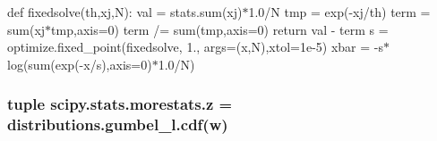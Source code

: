 def fixedsolve(th,xj,\+N)\+: val = stats.\+sum(xj)$\ast$1.0/\+N tmp = exp(-\/xj/th) term = sum(xj$\ast$tmp,axis=0) term /= sum(tmp,axis=0) return val -\/ term s = optimize.\+fixed\+\_\+point(fixedsolve, 1., args=(x,N),xtol=1e-\/5) xbar = -\/s$\ast$log(sum(exp(-\/x/s),axis=0)$\ast$1.0/\+N) 

\hypertarget{namespacescipy_1_1stats_1_1morestats_aa8cc3d21cb73a29266cecf589cc91372}{}
\subsubsection[{z}]{\setlength{\rightskip}{0pt plus 5cm}tuple scipy.\+stats.\+morestats.\+z = distributions.\+gumbel\+\_\+l.\+cdf({\bf w})}\label{namespacescipy_1_1stats_1_1morestats_aa8cc3d21cb73a29266cecf589cc91372}

